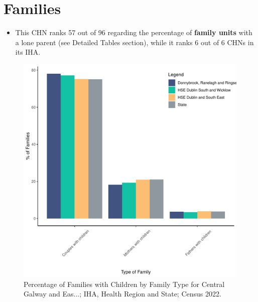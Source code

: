 \documentclass{article}
\begin{document}
\section{Families}\label{sect:Fam}
\begin{itemize}
\item This CHN ranks  57 out of 96 regarding the percentage of \textbf{family units} with a lone parent (see Detailed Tables section), while it ranks   6 out of 6 CHNs in its IHA.
\end{itemize}
\begin{figure}[H]
	\centering
	\includegraphics[width = 150mm]{../figures/FamED.pdf}
	\caption{Percentage of Families with Children by Family Type for Central Galway and Eas...; IHA, Health Region and State; Census 2022.}
	\label{fig:vbnv}
	\end{figure}
	
\end{document}
